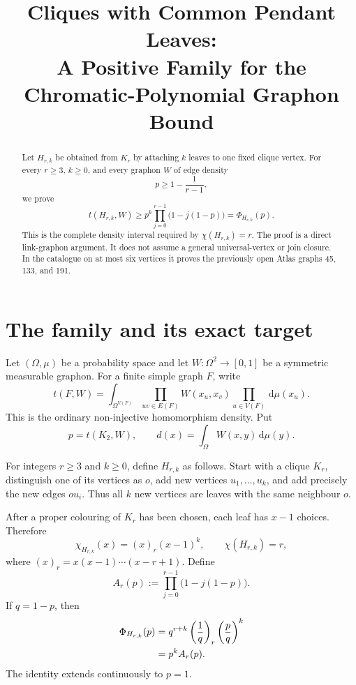 \documentclass[11pt]{article}
\title{Cliques with Common Pendant Leaves:\\
A Positive Family for the Chromatic-Polynomial Graphon Bound}
\author{}
\date{}
\newcommand{\dd}{\,\mathrm{d}}
\begin{document}
\maketitle

\begin{abstract}
Let $H_{r,k}$ be obtained from $K_r$ by attaching $k$ leaves to one
fixed clique vertex.  For every $r\geq3$, $k\geq0$, and every graphon
$W$ of edge density
\[
p\geq1-\frac1{r-1},
\]
we prove
\[
t(H_{r,k},W)
\geq
p^k\prod_{j=0}^{r-1}\bigl(1-j(1-p)\bigr)
=\Phi_{H_{r,k}}(p).
\]
This is the complete density interval required by
$\chi(H_{r,k})=r$.  The proof is a direct link-graphon argument.  It
does not assume a general universal-vertex or join closure.  In the
catalogue on at most six vertices it proves the previously open Atlas
graphs 45, 133, and 191.
\end{abstract}


\section{The family and its exact target}

Let $(\Omega,\mu)$ be a probability space and let
$W\colon\Omega^2\to[0,1]$ be a symmetric measurable graphon.  For a
finite simple graph $F$, write
\[
t(F,W)
=
\int_{\Omega^{V(F)}}
\prod_{uv\in E(F)}W(x_u,x_v)
\prod_{u\in V(F)}\dd\mu(x_u).
\]
This is the ordinary non-injective homomorphism density.  Put
\[
p=t(K_2,W),
\qquad
d(x)=\int_\Omega W(x,y)\dd\mu(y).
\]

For integers $r\geq3$ and $k\geq0$, define $H_{r,k}$ as follows.
Start with a clique $K_r$, distinguish one of its vertices as $o$, add
new vertices $u_1,\ldots,u_k$, and add precisely the new edges $ou_i$.
Thus all $k$ new vertices are leaves with the same neighbour $o$.

After a proper colouring of $K_r$ has been chosen, each leaf has
$x-1$ choices.  Therefore
\begin{equation}
\chi_{H_{r,k}}(x)=(x)_r(x-1)^k,
\qquad
\chi(H_{r,k})=r,
\label{eq:chromatic}
\end{equation}
where $(x)_r=x(x-1)\cdots(x-r+1)$.  Define
\[
A_r(p):=\prod_{j=0}^{r-1}\bigl(1-j(1-p)\bigr).
\]
If $q=1-p$, then
\begin{align}
\Phi_{H_{r,k}}(p)
&=
q^{r+k}
\left(\frac1q\right)_r
\left(\frac pq\right)^k
\notag\\
&=p^k A_r(p).
\label{eq:target}
\end{align}
The identity extends continuously to $p=1$.
\end{document}
